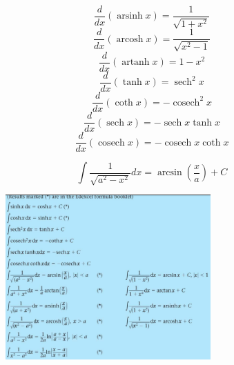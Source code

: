 \documentclass[a4paper,9pt]{scrartcl}
\DeclareMathOperator{\sech}{sech}
\DeclareMathOperator{\cosech}{cosech}
\DeclareMathOperator{\arcosh}{arcosh}
\DeclareMathOperator{\arsinh}{arsinh}
\DeclareMathOperator{\artanh}{artanh}
\begin{document}
    \begin{displaymath}
        \frac{d}{dx}\left(\arsinh{x}\right) = \frac{1}{\sqrt{1+x^2}}
    \end{displaymath}
    \begin{displaymath}
        \frac{d}{dx}\left(\arcosh{x}\right) = \frac{1}{\sqrt{x^2 - 1}}
    \end{displaymath}
    \begin{displaymath}
        \frac{d}{dx}\left(\artanh{x}\right) = 1-x^2
    \end{displaymath}
    \begin{displaymath}
        \frac{d}{dx}\left( \tanh{x} \right) = \sech^2{x}
    \end{displaymath}
    \begin{displaymath}
        \frac{d}{dx}\left( \coth{x} \right) = -\cosech^2{x}
    \end{displaymath}
    \begin{displaymath}
        \frac{d}{dx}\left( \sech{x} \right)=-\sech{x}\tanh{x}
    \end{displaymath}
    \begin{displaymath}
        \frac{d}{dx}\left( \cosech{x} \right)=-\cosech{x}\coth{x}
    \end{displaymath}


    \begin{displaymath}
        \int\frac{1}{\sqrt{a^2-x^2}} dx = \arcsin(\frac{x}{a}) + C
    \end{displaymath}

    \begin{figure}[!htb]
        \centering
        \includegraphics[width=0.7\textwidth]{FurtherIntegration.png}
    \end{figure}
\end{document}
